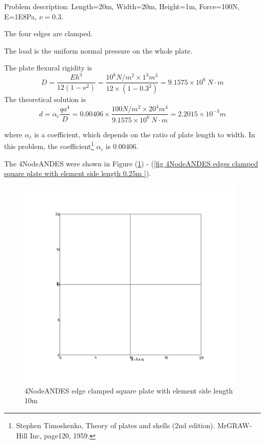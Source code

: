 \documentclass[fleqn,11pt,letter]{article}
\begin{document}
Problem description: Length=20m, Width=20m, Height=1m, Force=100N, E=1E8Pa, $\nu=0.3$. 

The four edges are clamped. 

The load is the uniform normal pressure on the whole plate. 


The plate flexural rigidity is 
\begin{equation}
  D=\frac{Eh^3}{12(1-\nu^2)}=\frac{10^8 N/m^2 \times 1^3 m^3 }{12 \times (1-0.3^2) }= 9.1575 \times 10^6 \ N\cdot m
\end{equation}
The theoretical solution is 
\begin{equation}
  d=\alpha_c \frac{q a^4}{D}=0.00406\times \frac{100 N/m^2 \times 20^4 m^4}{9.1575 \times 10^6 \ N\cdot m}=2.2015\times 10^{-3} m
\end{equation}

where $\alpha_c$ is a coefficient, which depends on the ratio of plate length to width. In this problem, the coefficient\footnote{Stephen Timoshenko, Theory of plates and shells (2nd edition). MrGRAW-Hill Inc, page120, 1959.} $\alpha_c$ is 0.00406.



The 4NodeANDES were shown in Figure (\ref{fig 4NodeANDES edges clamped square plate with element side length 10m }) - (\ref{fig 4NodeANDES edges clamped square plate with element side length 0.25m }). 


\begin{figure}[H]
  \centering
  \includegraphics[width=11cm]{../Figure_files/4NodeANDES/square_plate1.png}
  \caption{4NodeANDES edge clamped square plate with element side length 10m }
  \label{fig 4NodeANDES edges clamped square plate with element side length 10m }
\end{figure}
\end{document}
